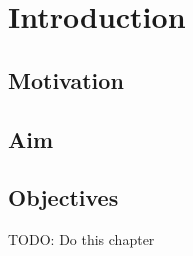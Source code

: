 \chapter{Introduction}
\label{cha:intro}

\section{Motivation}
\section{Aim}
\section{Objectives}


TODO: Do this chapter
